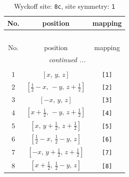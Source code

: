 \documentclass[fleqn,8pt]{jsarticle}
\begin{document}
\renewcommand{\arraystretch}{1.2}
\begin{longtable}{ccc}
\caption{Wyckoff site: {\tt 8c}, site symmetry: {\tt 1}}
 \\
 \hline \hline
No. & position & mapping \\ \hline \endfirsthead

\multicolumn{2}{l}{\tablename\ \thetable{}} \\
 \hline \hline
No. & position & mapping \\ \hline \endhead

 \hline \hline
\multicolumn{2}{r}{\footnotesize\it continued ...} \\ \endfoot

 \hline \hline
\multicolumn{2}{r}{} \\ \endlastfoot

1 & $\left[ x,\, y,\, z \right]$ & {\tt [1]} \\ \hline
2 & $\left[ \frac{1}{2} - x,\, - y,\, z + \frac{1}{2} \right]$ & {\tt [2]} \\ \hline
3 & $\left[ - x,\, y,\, z \right]$ & {\tt [3]} \\ \hline
4 & $\left[ x + \frac{1}{2},\, - y,\, z + \frac{1}{2} \right]$ & {\tt [4]} \\ \hline
5 & $\left[ x,\, y + \frac{1}{2},\, z + \frac{1}{2} \right]$ & {\tt [5]} \\ \hline
6 & $\left[ \frac{1}{2} - x,\, \frac{1}{2} - y,\, z \right]$ & {\tt [6]} \\ \hline
7 & $\left[ - x,\, y + \frac{1}{2},\, z + \frac{1}{2} \right]$ & {\tt [7]} \\ \hline
8 & $\left[ x + \frac{1}{2},\, \frac{1}{2} - y,\, z \right]$ & {\tt [8]} \\
\end{longtable}
\end{document}
